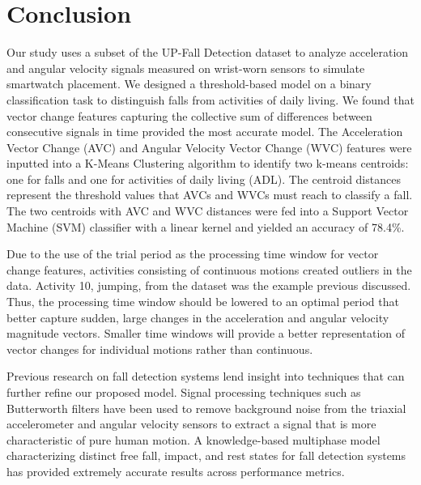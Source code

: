 \documentclass{llncs}
\begin{document}
    
\section{Conclusion}

Our study uses a subset of the UP-Fall Detection dataset to analyze acceleration and angular velocity signals measured on wrist-worn sensors to simulate smartwatch placement. We designed a threshold-based model on a binary classification task to distinguish falls from activities of daily living. We found that vector change features capturing the collective sum of differences between consecutive signals in time provided the most accurate model. The Acceleration Vector Change (AVC) and Angular Velocity Vector Change (WVC) features were inputted into a K-Means Clustering algorithm to identify two k-means centroids: one for falls and one for activities of daily living (ADL). The centroid distances represent the threshold values that AVCs and WVCs must reach to classify a fall. The two centroids with AVC and WVC distances were fed into a Support Vector Machine (SVM) classifier with a linear kernel and yielded an accuracy of 78.4\%. 

	Due to the use of the trial period as the processing time window for vector change features, activities consisting of continuous motions created outliers in the data. Activity 10, jumping, from the dataset was the example previous discussed. Thus, the processing time window should be lowered to an optimal period that better capture sudden, large changes in the acceleration and angular velocity magnitude vectors. Smaller time windows will provide a better representation of vector changes for individual motions rather than continuous. 
	
	Previous research on fall detection systems lend insight into techniques that can further refine our proposed model. Signal processing techniques such as Butterworth filters have been used to remove background noise from the triaxial accelerometer and angular velocity sensors to extract a signal that is more characteristic of pure human motion. A knowledge-based multiphase model characterizing distinct free fall, impact, and rest states for fall detection systems has provided extremely accurate results across performance metrics. 
\end{document}

